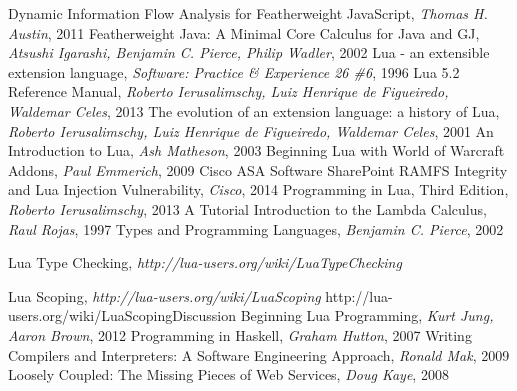 \begin{thebibliography}{10}

 Dynamic Information Flow Analysis for Featherweight JavaScript, {\it Thomas H. Austin}, 2011
 Featherweight Java: A Minimal Core Calculus for Java and GJ, {\it Atsushi Igarashi, Benjamin C. Pierce, Philip Wadler}, 2002
 Lua - an extensible extension language, {\it  Software: Practice \& Experience 26 \#6}, 1996
 Lua 5.2 Reference Manual, {\it Roberto Ierusalimschy, Luiz Henrique de Figueiredo, Waldemar Celes}, 2013
 The evolution of an extension language: a history of Lua, {\it  Roberto Ierusalimschy, Luiz Henrique de Figueiredo, Waldemar Celes}, 2001
 An Introduction to Lua, {\it  Ash Matheson}, 2003
 Beginning Lua with World of Warcraft Addons, {\it Paul Emmerich}, 2009
 Cisco ASA Software SharePoint RAMFS Integrity and Lua Injection Vulnerability, {\it Cisco}, 2014
 Programming in Lua, Third Edition, {\it  Roberto Ierusalimschy}, 2013
 A Tutorial Introduction to the Lambda Calculus, {\it Raul Rojas}, 1997
 Types and Programming Languages, {\it Benjamin C. Pierce}, 2002

 Lua Type Checking, {\it http://lua-users.org/wiki/LuaTypeChecking}

 Lua Scoping, {\it http://lua-users.org/wiki/LuaScoping}
 http://lua-users.org/wiki/LuaScopingDiscussion
 Beginning Lua Programming, {\it Kurt Jung, Aaron Brown}, 2012
 Programming in Haskell, {\it Graham Hutton}, 2007
 Writing Compilers and Interpreters: A Software Engineering Approach, {\it Ronald Mak}, 2009
 Loosely Coupled: The Missing Pieces of Web Services, {\it Doug Kaye}, 2008
\\

\end{thebibliography}
